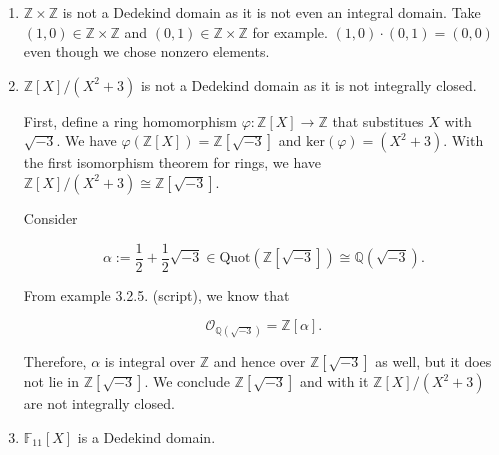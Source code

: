 \documentclass[a4paper]{article}
\theoremstyle{definition}
\begin{document}
\begin{enumerate}
    \item \(\mathbb{Z}\times\mathbb{Z}\) is not a Dedekind domain as it is not even an integral domain. Take \((1, 0) \in \mathbb{Z}\times\mathbb{Z}\) and \((0, 1) \in \mathbb{Z}\times\mathbb{Z}\) for example. \((1, 0) \cdot (0, 1) = (0, 0)\) even though we chose nonzero elements.
    \item \(\mathbb{Z}[X] / (X^2 + 3)\) is not a Dedekind domain as it is not integrally closed.

    First, define a ring homomorphism \(\varphi: \mathbb{Z}[X] \rightarrow \mathbb{Z}\) that substitues \(X\) with \(\sqrt{-3}\). We have \(\varphi(\mathbb{Z}[X]) = \mathbb{Z}[\sqrt{-3}]\) and \(\text{ker} (\varphi) = (X^2 + 3)\). With the first isomorphism theorem for rings, we have \(\mathbb{Z}[X] / (X^2 + 3) \cong \mathbb{Z}[\sqrt{-3}]\).

    Consider

    \begin{equation}
        \alpha := \frac{1}{2} + \frac{1}{2} \sqrt{-3} \in \text{Quot}(\mathbb{Z}[\sqrt{-3}]) \cong \mathbb{Q}(\sqrt{-3}) \text{.}
    \end{equation}

    From example 3.2.5. (script), we know that

    \begin{equation}
        \mathcal{O}_{\mathbb{Q}(\sqrt{-3})} = \mathbb{Z}[\alpha] \text{.}
    \end{equation}
    
    Therefore, \(\alpha\) is integral over \(\mathbb{Z}\) and hence over \(\mathbb{Z}[\sqrt{-3}]\) as well, but it does not lie in \(\mathbb{Z}[\sqrt{-3}]\). We conclude \(\mathbb{Z}[\sqrt{-3}]\) and with it \(\mathbb{Z}[X] / (X^2 + 3)\) are not integrally closed.
    \item \(\mathbb{F}_{11}[X]\) is a Dedekind domain.
    

\end{enumerate}
\end{document}
